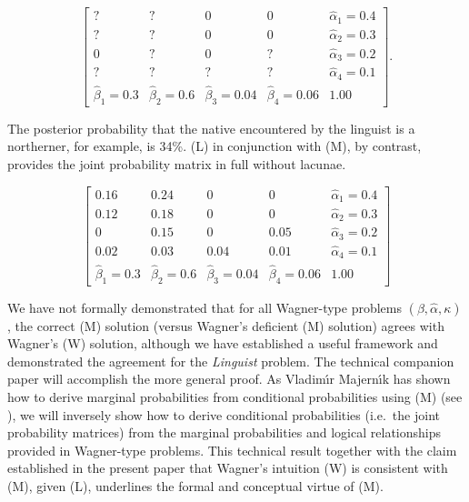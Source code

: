 \begin{equation}
  \label{eq:p8}
      \left[
      \begin{array}{ccccc}
        ? & ? & 0 & 0 & \hat{\alpha}_{1}=0.4 \\
        ? & ? & 0 & 0 & \hat{\alpha}_{2}=0.3 \\
        0 & ? & 0 & ? & \hat{\alpha}_{3}=0.2 \\
        ? & ? & ? & ? & \hat{\alpha}_{4}=0.1 \\
        \hat{\beta}_{1}=0.3 & \hat{\beta}_{2}=0.6 & \hat{\beta}_{3}=0.04 & \hat{\beta}_{4}=0.06 & 1.00
      \end{array}
\right].
\end{equation}

The posterior probability that the native encountered by the linguist
is a northerner, for example, is 34\%. (L) in conjunction with (M), by
contrast, provides the joint probability matrix in full without
lacunae.

\begin{equation}
  \label{eq:p11}
      \left[
      \begin{array}{ccccc}
        0.16 & 0.24 & 0 & 0 & \hat{\alpha}_{1}=0.4 \\
        0.12 & 0.18 & 0 & 0 & \hat{\alpha}_{2}=0.3 \\
        0 & 0.15 & 0 & 0.05 & \hat{\alpha}_{3}=0.2 \\
        0.02 & 0.03 & 0.04 & 0.01 & \hat{\alpha}_{4}=0.1 \\
        \hat{\beta}_{1}=0.3 & \hat{\beta}_{2}=0.6 & \hat{\beta}_{3}=0.04 & \hat{\beta}_{4}=0.06 & 1.00
      \end{array}
\right]
\end{equation}

We have not formally demonstrated that for all Wagner-type problems
$(\beta,\hat{\alpha},\kappa)$, the correct (M) solution (versus
Wagner's deficient (M) solution) agrees with Wagner's (W) solution,
although we have established a useful framework and demonstrated the
agreement for the \emph{Linguist} problem. The technical companion
paper will accomplish the more general proof. As Vladim{\'\i}r
Majern{\'\i}k has shown how to derive marginal probabilities from
conditional probabilities using (M) (see ), we
will inversely show how to derive conditional probabilities (i.e.\ the
joint probability matrices) from the marginal probabilities and
logical relationships provided in Wagner-type problems. This technical
result together with the claim established in the present paper that
Wagner's intuition (W) is consistent with (M), given (L), underlines
the formal and conceptual virtue of (M).